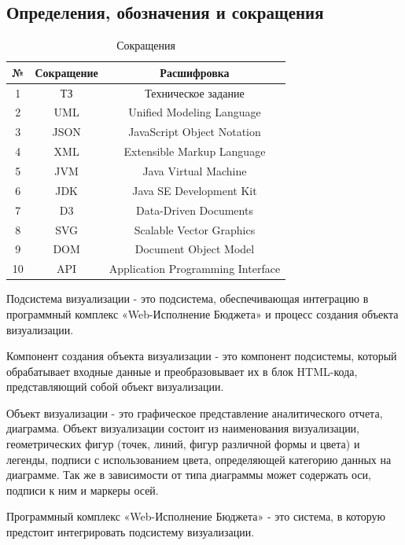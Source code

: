 \documentclass[a4paper]{extarticle}
\begin{document}
\subsection*{Определения, обозначения и сокращения}
\begin{table}[H]
\caption{Сокращения}
\centering
  \begin{tabular}{|c|c|c|}
  \hline
  №  & Сокращение & Расшифровка \\\hline
  1  & ТЗ   & Техническое задание \\\hline
  2  & UML  & Unified Modeling Language \\\hline
  3  & JSON & JavaScript Object Notation \\\hline
  4  & XML  & Extensible Markup Language \\\hline
  5  & JVM  & Java Virtual Machine \\\hline
  6  & JDK  & Java SE Development Kit \\\hline
  7  & D3   & Data-Driven Documents \\\hline
  8  & SVG  & Scalable Vector Graphics \\\hline
  9  & DOM  & Document Object Model \\\hline
  10 & API  & Application Programming Interface \\
  \hline
  \end{tabular}
\end{table}\par
Подсистема визуализации - это подсистема, обеспечивающая интеграцию в программный комплекс «Web-Исполнение Бюджета» и процесс создания объекта визуализации.\par
Компонент создания объекта визуализации - это компонент подсистемы, который обрабатывает входные данные и преобразовывает их в блок HTML-кода, представляющий собой объект визуализации.\par
Объект визуализации - это графическое представление аналитического отчета, диаграмма. Объект визуализации состоит из наименования визуализации, геометрических фигур (точек, линий, фигур различной формы и цвета) и легенды, подписи с использованием цвета, определяющей категорию данных на диаграмме. Так же в зависимости от типа диаграммы может содержать оси, подписи к ним и маркеры осей.\par
Программный комплекс «Web-Исполнение Бюджета» - это система, в которую предстоит интегрировать подсистему визуализации.\par
\end{document}
